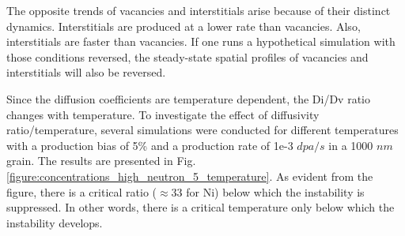 \documentclass[utf8]{frontiersSCNS} %
\begin{document}
    The opposite trends of vacancies and interstitials arise because of their distinct dynamics. Interstitials are produced at a lower rate than vacancies. Also, interstitials are faster than vacancies. If one runs a hypothetical simulation with those conditions reversed, the steady-state spatial profiles of vacancies and interstitials will also be reversed.
    
    Since the diffusion coefficients are temperature dependent, the Di/Dv ratio changes with temperature. To investigate the effect of diffusivity ratio/temperature, several simulations were conducted for different temperatures with a production bias of 5\% and a production rate of 1e-3 $dpa/s$ in a 1000 $nm$ grain. The results are presented in Fig. \ref{figure:concentrations_high_neutron_5_temperature}. As evident from the figure, there is a critical ratio ($\approx$33 for Ni) below which the instability is suppressed. In other words, there is a critical temperature only below which the instability develops.
    
\end{document}
